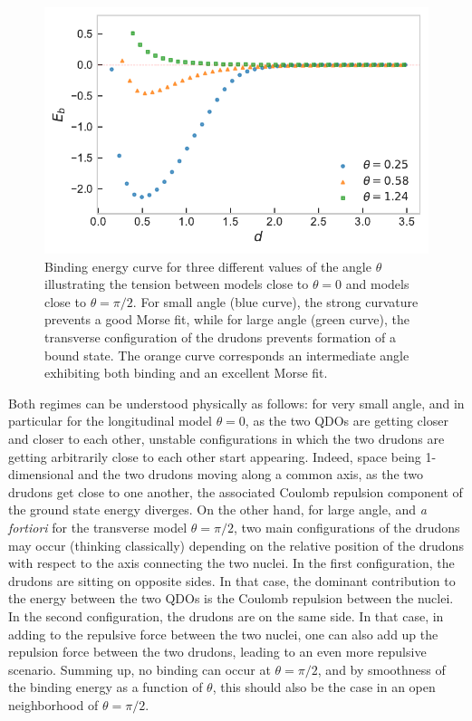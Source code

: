 \documentclass[reprint, amsmath, amssymb, aps, pra]{revtex4-2}
\begin{document}
    \begin{figure}
        \includegraphics[scale=0.75]{figures/binding_vs_smooth.pdf}
        \caption{\label{fig:binding_vs_smooth}Binding energy curve for three different values of the angle $\theta$ illustrating the tension between models close to $\theta=0$ and models close to $\theta=\pi/2$. For small angle (blue curve),  the strong curvature prevents a good Morse fit, while for large angle (green curve), the transverse configuration of the drudons prevents formation of a bound state. The orange curve corresponds an intermediate angle exhibiting both binding and an excellent Morse fit.}
    \end{figure}

    Both regimes can be understood physically as follows: for very small angle, and in particular for the longitudinal model $\theta=0$, as the two QDOs are getting closer and closer to each other, unstable configurations in which the two drudons are getting arbitrarily close to each other start appearing. Indeed, space being 1-dimensional and the two drudons moving along a common axis, as the two drudons get close to one another, the associated Coulomb repulsion component of the ground state energy diverges. On the other hand, for large angle, and \textit{a fortiori} for the transverse model $\theta=\pi/2$, two main configurations of the drudons may occur (thinking classically) depending on the relative position of the drudons with respect to the axis connecting the two nuclei. In the first configuration, the drudons are sitting on opposite sides. In that case, the dominant contribution to the energy between the two QDOs is the Coulomb repulsion between the nuclei. In the second configuration, the drudons are on the same side. In that case, in adding to the repulsive force between the two nuclei, one can also add up the repulsion force between the two drudons, leading to an even more repulsive scenario. Summing up, no binding can occur at $\theta=\pi/2$, and by smoothness of the binding energy as a function of $\theta$, this should also be the case in an open neighborhood of $\theta=\pi/2$.
\end{document}
